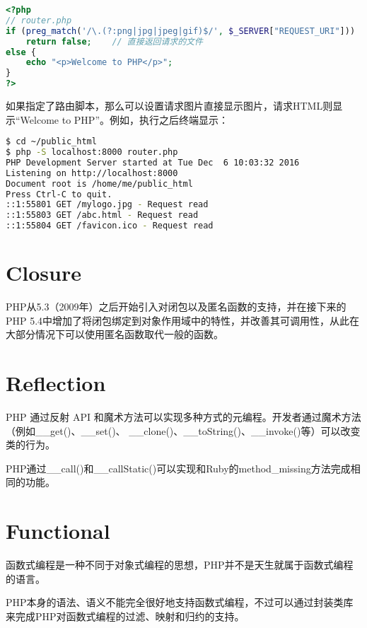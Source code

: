 \begin{lstlisting}[language=PHP]
<?php
// router.php
if (preg_match('/\.(?:png|jpg|jpeg|gif)$/', $_SERVER["REQUEST_URI"]))
    return false;    // 直接返回请求的文件
else { 
    echo "<p>Welcome to PHP</p>";
}
?>
\end{lstlisting}


如果指定了路由脚本，那么可以设置请求图片直接显示图片，请求HTML则显示“Welcome to PHP”。例如，执行之后终端显示：


\begin{lstlisting}[language=bash]
$ cd ~/public_html
$ php -S localhost:8000 router.php
PHP Development Server started at Tue Dec  6 10:03:32 2016
Listening on http://localhost:8000
Document root is /home/me/public_html
Press Ctrl-C to quit.
::1:55801 GET /mylogo.jpg - Request read
::1:55803 GET /abc.html - Request read
::1:55804 GET /favicon.ico - Request read
\end{lstlisting}


\section{Closure}

PHP从5.3（2009年）之后开始引入对闭包以及匿名函数的支持，并在接下来的PHP 5.4中增加了将闭包绑定到对象作用域中的特性，并改善其可调用性，从此在大部分情况下可以使用匿名函数取代一般的函数。

\section{Reflection}

PHP 通过反射 API 和魔术方法可以实现多种方式的元编程。开发者通过魔术方法（例如\_\_get()、\_\_set()、 \_\_clone()、\_\_toString()、\_\_invoke()等）可以改变类的行为。

PHP通过\_\_call()和\_\_callStatic()可以实现和Ruby的method\_missing方法完成相同的功能。

\section{Functional}


函数式编程是一种不同于对象式编程的思想，PHP并不是天生就属于函数式编程的语言。

PHP本身的语法、语义不能完全很好地支持函数式编程，不过可以通过封装类库来完成PHP对函数式编程的过滤、映射和归约的支持。


